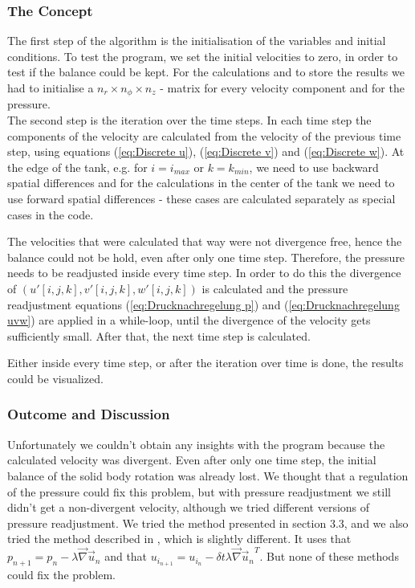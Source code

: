 \documentclass[12pt, a4paper]{article} %
\begin{document}
		\subsubsection{The Concept}
			The first step of the algorithm is the initialisation of the variables and initial conditions. To test the program, we set the initial velocities to zero, in order to test if the balance could be kept. For the calculations and to store the results we had to initialise a $n_r \times n_\phi \times n_z$ - matrix for every velocity component and for the pressure. \\
			
			The second step is the iteration over the time steps. In each time step the components of the velocity are calculated from the velocity of the previous time step, using equations (\ref{eq:Discrete u}), (\ref{eq:Discrete v}) and (\ref{eq:Discrete w}). At the edge of the tank, e.g. for $i=i_{max}$ or $k=k_{min}$, we need to use backward spatial differences and for the calculations in the center of the tank we need to use forward spatial differences - these cases are calculated separately as special cases in the code.
			
			The velocities that were calculated that way were not divergence free, hence the balance could not be hold, even after only one time step. Therefore, the pressure needs to be readjusted inside every time step. In order to do this the divergence of $\left(u'[i,j,k], v'[i,j,k], w'[i,j,k]\right)$ is calculated and the pressure readjustment equations (\ref{eq:Drucknachregelung p}) and (\ref{eq:Drucknachregelung uvw}) are applied in a while-loop, until the divergence of the velocity gets sufficiently small.
			After that, the next time step is calculated.
			
			Either inside every time step, or after the iteration over time is done, the results could be visualized.

		\subsubsection{Outcome and Discussion}
			Unfortunately we couldn't obtain any insights with the program because the calculated velocity was divergent. Even after only one time step, the initial balance of the solid body rotation was already lost. We thought that a regulation of the pressure  could fix this problem, but with pressure readjustment we still  didn't get a non-divergent velocity, although we tried different versions of pressure readjustment. 
			We tried the method presented in section 3.3, and we also tried the method described in \cite{Schmittfull2005}
			, which is slightly different. It uses that $p_{n+1} = p_n - \lambda \vec{\nabla} \vec{u}_n$ and that $u_{i_{n+1}} = u_{i_{n}} - \delta t \lambda \vec{\nabla}{\vec{u}_n}^T$. But none of these methods could fix the problem.\\
			
\end{document}

